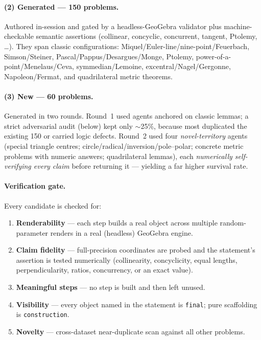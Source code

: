 \documentclass[11pt]{article}
\begin{document}
\paragraph{(2) Generated --- 150 problems.} Authored in-session and gated by a
headless-GeoGebra validator plus machine-checkable semantic assertions
(collinear, concyclic, concurrent, tangent, Ptolemy, \ldots). They span classic
configurations: Miquel/Euler-line/nine-point/Feuerbach, Simson/Steiner,
Pascal/Pappus/Desargues/Monge, Ptolemy, power-of-a-point/Menelaus/Ceva,
symmedian/Lemoine, excentral/Nagel/Gergonne, Napoleon/Fermat, and quadrilateral
metric theorems.

\paragraph{(3) New --- 60 problems.} Generated in two rounds. Round~1 used
agents anchored on classic lemmas; a strict adversarial audit (below) kept only
$\sim$25\%, because most duplicated the existing 150 or carried logic defects.
Round~2 used four \emph{novel-territory} agents (special triangle centres;
circle/radical/inversion/pole--polar; concrete metric problems with numeric
answers; quadrilateral lemmas), each \emph{numerically self-verifying every
claim} before returning it --- yielding a far higher survival rate.

\paragraph{Verification gate.} Every candidate is checked for:
\begin{enumerate}[noitemsep,topsep=2pt]
  \item \textbf{Renderability} --- each step builds a real object across
  multiple random-parameter renders in a real (headless) GeoGebra engine.
  \item \textbf{Claim fidelity} --- full-precision coordinates are probed and
  the statement's assertion is tested numerically (collinearity, concyclicity,
  equal lengths, perpendicularity, ratios, concurrency, or an exact value).
  \item \textbf{Meaningful steps} --- no step is built and then left unused.
  \item \textbf{Visibility} --- every object named in the statement is
  \texttt{final}; pure scaffolding is \texttt{construction}.
  \item \textbf{Novelty} --- cross-dataset near-duplicate scan against all other
  problems.
\end{enumerate}
\end{document}
